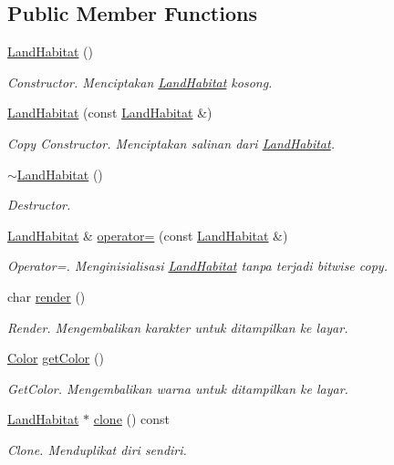 \subsection*{Public Member Functions}
\begin{DoxyCompactItemize}
\item 
\hyperlink{classLandHabitat_afa67ffdf6984ec7c1fcc6ec27d5628d3}{Land\+Habitat} ()
\begin{DoxyCompactList}\small\item\em Constructor. Menciptakan \hyperlink{classLandHabitat}{Land\+Habitat} kosong. \end{DoxyCompactList}\item 
\hyperlink{classLandHabitat_a972dfd8694705728d9d653bc1abfe218}{Land\+Habitat} (const \hyperlink{classLandHabitat}{Land\+Habitat} \&)
\begin{DoxyCompactList}\small\item\em Copy Constructor. Menciptakan salinan dari \hyperlink{classLandHabitat}{Land\+Habitat}. \end{DoxyCompactList}\item 
\hyperlink{classLandHabitat_a0c1aebc080f875b9053f3a776aea627a}{$\sim$\+Land\+Habitat} ()
\begin{DoxyCompactList}\small\item\em Destructor. \end{DoxyCompactList}\item 
\hyperlink{classLandHabitat}{Land\+Habitat} \& \hyperlink{classLandHabitat_ad29b62dd7904d2b3b60b6f9bb618a6c0}{operator=} (const \hyperlink{classLandHabitat}{Land\+Habitat} \&)
\begin{DoxyCompactList}\small\item\em Operator=. Menginisialisasi \hyperlink{classLandHabitat}{Land\+Habitat} tanpa terjadi bitwise copy. \end{DoxyCompactList}\item 
char \hyperlink{classLandHabitat_a5e7bbde5412a950bb3157783a54cd022}{render} ()
\begin{DoxyCompactList}\small\item\em Render. Mengembalikan karakter untuk ditampilkan ke layar. \end{DoxyCompactList}\item 
\hyperlink{color_8h_ab87bacfdad76e61b9412d7124be44c1c}{Color} \hyperlink{classLandHabitat_af4bf8c06bf6cd24f347030e420349ef1}{get\+Color} ()
\begin{DoxyCompactList}\small\item\em Get\+Color. Mengembalikan warna untuk ditampilkan ke layar. \end{DoxyCompactList}\item 
\hyperlink{classLandHabitat}{Land\+Habitat} $\ast$ \hyperlink{classLandHabitat_add986b725e19b857d3e3fa66689cda73}{clone} () const 
\begin{DoxyCompactList}\small\item\em Clone. Menduplikat diri sendiri. \end{DoxyCompactList}\end{DoxyCompactItemize}
